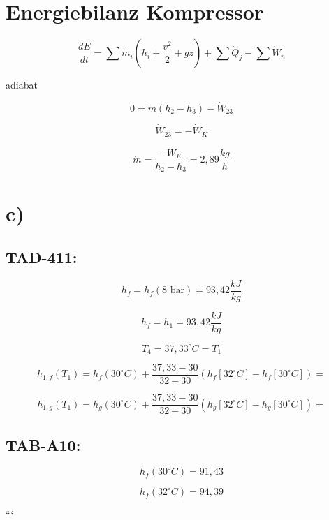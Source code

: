 \section*{Energiebilanz Kompressor}

\begin{equation*}
\frac{dE}{dt} = \sum \dot{m}_i \left( h_i + \frac{v^2}{2} + g z \right) + \sum \dot{Q}_j - \sum \dot{W}_n
\end{equation*}

adiabat

\begin{equation*}
0 = \dot{m} (h_2 - h_3) - \dot{W}_{23}
\end{equation*}

\begin{equation*}
\dot{W}_{23} = -\dot{W}_K
\end{equation*}

\begin{equation*}
\dot{m} = \frac{-\dot{W}_K}{h_2 - h_3} = 2,89 \frac{kg}{h}
\end{equation*}

\section*{c)}

\subsection*{TAD-411:}

\begin{equation*}
h_f = h_f (8 \text{ bar}) = 93,42 \frac{kJ}{kg}
\end{equation*}

\begin{equation*}
h_f = h_1 = 93,42 \frac{kJ}{kg}
\end{equation*}

\begin{equation*}
T_{4} = 37,33^\circ C = T_{1}
\end{equation*}

\begin{equation*}
h_{1,f} (T_1) = h_f (30^\circ C) + \frac{37,33 - 30}{32 - 30} (h_{f} [32^\circ C] - h_f [30^\circ C]) =
\end{equation*}

\begin{equation*}
h_{1,g} (T_1) = h_g (30^\circ C) + \frac{37,33 - 30}{32 - 30} (h_{g} [32^\circ C] - h_g [30^\circ C]) =
\end{equation*}

\subsection*{TAB-A10:}

\begin{equation*}
h_f (30^\circ C) = 91,43
\end{equation*}

\begin{equation*}
h_f (32^\circ C) = 94,39
\end{equation*}

```